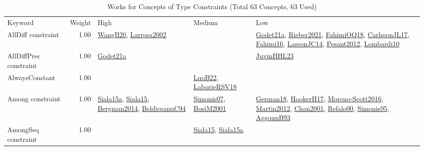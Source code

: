 {\scriptsize
\begin{longtable}{p{3cm}r>{\raggedright\arraybackslash}p{6cm}>{\raggedright\arraybackslash}p{6cm}>{\raggedright\arraybackslash}p{8cm}}
\rowcolor{white}\caption{Works for Concepts of Type Constraints (Total 63 Concepts, 63 Used)}\\ \toprule
\rowcolor{white}Keyword & Weight & High & Medium & Low\\ \midrule\endhead
\bottomrule
\endfoot
\index{AllDiff constraint}\index{Constraints!AllDiff constraint}AllDiff constraint &  1.00 & \hyperref[detail:WangB20]{WangB20}, \hyperref[detail:Larrosa2002]{Larrosa2002} &  & \hyperref[detail:Godet21a]{Godet21a}, \hyperref[detail:Rieber2021]{Rieber2021}, \hyperref[detail:FahimiOQ18]{FahimiOQ18}, \hyperref[detail:CarlssonJL17]{CarlssonJL17}, \hyperref[detail:Fahimi16]{Fahimi16}, \hyperref[detail:LarsonJC14]{LarsonJC14}, \hyperref[detail:Pesant2012]{Pesant2012}, \hyperref[detail:Lombardi10]{Lombardi10}\\
\index{AllDiffPrec constraint}\index{Constraints!AllDiffPrec constraint}AllDiffPrec constraint &  1.00 & \hyperref[detail:Godet21a]{Godet21a} &  & \hyperref[detail:JuvinHHL23]{JuvinHHL23}\\
\index{AlwaysConstant}\index{Constraints!AlwaysConstant}AlwaysConstant &  1.00 &  & \hyperref[detail:LuoB22]{LuoB22}, \hyperref[detail:LaborieRSV18]{LaborieRSV18} & \\
\index{Among constraint}\index{Constraints!Among constraint}Among constraint &  1.00 & \hyperref[detail:Siala15a]{Siala15a}, \hyperref[detail:Siala15]{Siala15}, \hyperref[detail:Bergman2014]{Bergman2014}, \hyperref[detail:BeldiceanuC94]{BeldiceanuC94} & \hyperref[detail:Simonis07]{Simonis07}, \hyperref[detail:BosiM2001]{BosiM2001} & \hyperref[detail:German18]{German18}, \hyperref[detail:HookerH17]{HookerH17}, \hyperref[detail:Moreno-Scott2016]{Moreno-Scott2016}, \hyperref[detail:Martin2012]{Martin2012}, \hyperref[detail:Chan2001]{Chan2001}, \hyperref[detail:Refalo00]{Refalo00}, \hyperref[detail:Simonis95]{Simonis95}, \hyperref[detail:AggounB93]{AggounB93}\\
\index{AmongSeq constraint}\index{Constraints!AmongSeq constraint}AmongSeq constraint &  1.00 &  & \hyperref[detail:Siala15]{Siala15}, \hyperref[detail:Siala15a]{Siala15a} & \\

\end{longtable}}
